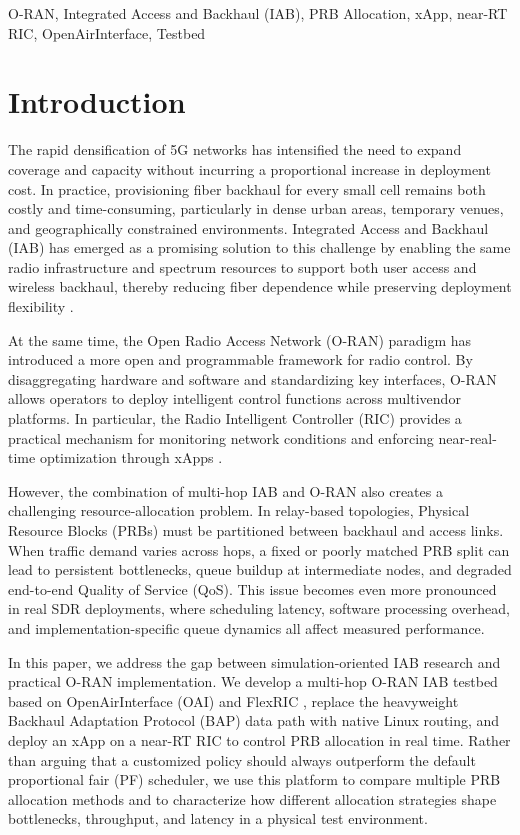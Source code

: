 \documentclass[conference, a4paper]{IEEEtran}
\begin{document}
\begin{IEEEkeywords}
O-RAN, Integrated Access and Backhaul (IAB), PRB Allocation, xApp, near-RT RIC, OpenAirInterface, Testbed
\end{IEEEkeywords}

\section{Introduction}
The rapid densification of 5G networks has intensified the need to expand coverage and capacity without incurring a proportional increase in deployment cost. In practice, provisioning fiber backhaul for every small cell remains both costly and time-consuming, particularly in dense urban areas, temporary venues, and geographically constrained environments. Integrated Access and Backhaul (IAB) has emerged as a promising solution to this challenge by enabling the same radio infrastructure and spectrum resources to support both user access and wireless backhaul, thereby reducing fiber dependence while preserving deployment flexibility \cite{polese2020iab,ronkainen2021iab,3gpp38874}.

At the same time, the Open Radio Access Network (O-RAN) paradigm has introduced a more open and programmable framework for radio control. By disaggregating hardware and software and standardizing key interfaces, O-RAN allows operators to deploy intelligent control functions across multivendor platforms. In particular, the Radio Intelligent Controller (RIC) provides a practical mechanism for monitoring network conditions and enforcing near-real-time optimization through xApps \cite{polese2023coloran,villa2024x5g,cheng2024oranslice,oran-wg3-e2}.

However, the combination of multi-hop IAB and O-RAN also creates a challenging resource-allocation problem. In relay-based topologies, Physical Resource Blocks (PRBs) must be partitioned between backhaul and access links. When traffic demand varies across hops, a fixed or poorly matched PRB split can lead to persistent bottlenecks, queue buildup at intermediate nodes, and degraded end-to-end Quality of Service (QoS). This issue becomes even more pronounced in real SDR deployments, where scheduling latency, software processing overhead, and implementation-specific queue dynamics all affect measured performance.

In this paper, we address the gap between simulation-oriented IAB research and practical O-RAN implementation. We develop a multi-hop O-RAN IAB testbed based on OpenAirInterface (OAI) \cite{kaltenberger2021oai} and FlexRIC \cite{lacava2023flexric}, replace the heavyweight Backhaul Adaptation Protocol (BAP) data path with native Linux routing, and deploy an xApp on a near-RT RIC to control PRB allocation in real time. Rather than arguing that a customized policy should always outperform the default proportional fair (PF) scheduler, we use this platform to compare multiple PRB allocation methods and to characterize how different allocation strategies shape bottlenecks, throughput, and latency in a physical test environment.
\end{document}
